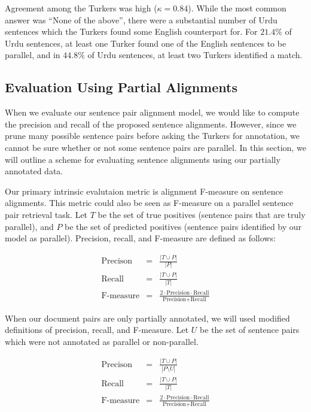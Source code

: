 Agreement among the Turkers was high ($\kappa = 0.84$). While the most common
answer was ``None of the above'', there were a substantial number of Urdu
sentences which the Turkers found some English counterpart for. For $21.4\%$ of Urdu
sentences, at least one Turker found one of the English sentences to be
parallel, and in $44.8\%$ of Urdu sentences, at least two Turkers identified a match.


\subsection{Evaluation Using Partial Alignments}
\label{sec:partial}
When we evaluate our sentence pair alignment model, we would like to compute the
precision and recall of the proposed sentence alignments. However, since we
prune many possible sentence pairs before asking the Turkers for annotation, we
cannot be sure whether or not some sentence pairs are parallel. In this section,
we will outline a scheme for evaluating sentence alignments using our partially
annotated data.

Our primary intrinsic evalutaion metric is alignment F-measure on sentence
alignments. This metric could also be seen as F-measure on a parallel sentence
pair retrieval task. Let $T$ be the set of true positives (sentence pairs that
are truly parallel), and $P$ be the set of predicted positives (sentence pairs
identified by our model as parallel). Precision, recall, and F-measure are
defined as follows:

\begin{align*}
\mbox{Precison}&=& \frac{|T \cup P|}{|P|}\\
\mbox{Recall}&=& \frac{|T \cup P|}{|T|}\\
\mbox{F-measure}&=& \frac{2 \cdot \mbox{Precision} \cdot
\mbox{Recall}}{\mbox{Precision} + \mbox{Recall}}
\end{align*}

When our document pairs are only partially annotated, we will used modified
definitions of precision, recall, and F-measure. Let $U$ be the set of sentence
pairs which were not annotated as parallel or non-parallel.

\begin{align*}
\mbox{Precison}&=& \frac{|T \cup P|}{|P \setminus U|}\\
\mbox{Recall}&=& \frac{|T \cup P|}{|T|}\\
\mbox{F-measure}&=& \frac{2 \cdot \mbox{Precision} \cdot
\mbox{Recall}}{\mbox{Precision} + \mbox{Recall}}
\end{align*}

